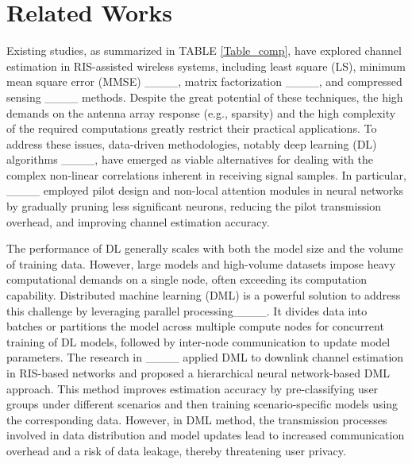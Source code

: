 \section{Related Works}
\label{relatedworks}
Existing studies, as summarized in TABLE \ref{Table_comp}, have explored channel estimation in RIS-assisted wireless systems, including least square (LS), minimum mean square error (MMSE) ____, matrix factorization ____, and compressed sensing ____ methods. Despite the great potential of these techniques, the high demands on the antenna array response (e.g., sparsity) and the high complexity of the required computations greatly restrict their practical applications. To address these issues, data-driven methodologies, notably deep learning (DL) algorithms ____, have emerged as viable alternatives for dealing with the complex non-linear correlations inherent in receiving signal samples. In particular, ____ employed pilot design and non-local attention modules in neural networks by gradually pruning less significant neurons, reducing the pilot transmission overhead, and improving channel estimation accuracy. 


The performance of DL  generally scales with both the model size and the volume of training data. However, large models and high-volume datasets impose heavy computational demands on a single node, often exceeding  its  computation capability.  Distributed machine learning (DML) is a powerful solution to address this challenge  by leveraging parallel processing____. It divides data into batches or partitions the model across multiple compute nodes for concurrent training of DL models, followed by inter-node communication to update model parameters. 
The research in ____ applied DML to downlink channel estimation in RIS-based networks and proposed a hierarchical neural network-based DML approach. This method improves estimation accuracy by pre-classifying user groups under different scenarios and then training scenario-specific models using the corresponding data. However,  in DML method, the transmission processes involved in data distribution and model updates  lead to increased   communication overhead and   a risk of data leakage, thereby threatening user privacy. %

